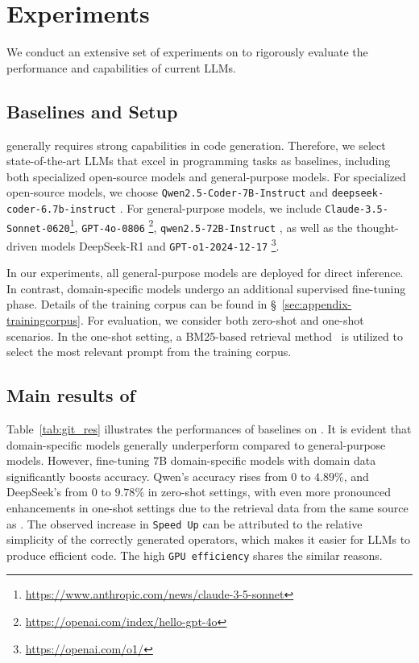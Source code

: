 \section{Experiments}
We conduct an extensive set of experiments on \benchall to rigorously evaluate the performance and capabilities of current LLMs.


\subsection{Baselines and Setup}
\label{sec:baselines}
\benchall generally requires strong capabilities in code generation. Therefore, we select state-of-the-art LLMs that excel in programming tasks as baselines, including both specialized open-source models and general-purpose models.
For specialized open-source models, we choose \texttt{Qwen2.5-Coder-7B-Instruct} \cite{hui2024qwen2} and \texttt{deepseek-coder-6.7b-instruct} \cite{guo2024deepseek}.
For general-purpose models, we include \texttt{Claude-3.5-Sonnet-0620}\footnote{\href{https://www.anthropic.com/news/claude-3-5-sonnet}{https://www.anthropic.com/news/claude-3-5-sonnet}}, \texttt{GPT-4o-0806} \footnote{\href{https://openai.com/index/hello-gpt-4o}{https://openai.com/index/hello-gpt-4o}}, \texttt{qwen2.5-72B-Instruct} \cite{yang2024qwen2}, as well as the thought-driven models DeepSeek-R1 \cite{guo2025deepseek} and \texttt{GPT-o1-2024-12-17} \footnote{\href{https://openai.com/o1/}{https://openai.com/o1/}}.


In our experiments, all general-purpose models are deployed for direct inference. 
In contrast, domain-specific models undergo an additional supervised fine-tuning phase. 
Details of the training corpus can be found in \S~\ref{sec:appendix-trainingcorpus}.
For evaluation, we consider both zero-shot and one-shot scenarios. 
In the one-shot setting, a BM25-based retrieval method~\cite{bm25robertson2009} is utilized to select the most relevant prompt from the training corpus. 


\subsection{Main results of \benchone}
\label{sec:main_res}
Table~\ref{tab:git_res} illustrates the performances of baselines on \benchone. 
It is evident that domain-specific models generally underperform compared to general-purpose models. 
However, fine-tuning $7$B domain-specific models with domain data significantly boosts accuracy. 
Qwen's accuracy rises from $0$ to $4.89$\%, and DeepSeek's from $0$ to $9.78$\% in zero-shot settings, with even more pronounced enhancements in one-shot settings due to the retrieval data from the same source as \benchone. 
The observed increase in \texttt{Speed Up} can be attributed to the relative simplicity of the correctly generated operators, which makes it easier for LLMs to produce efficient code.
The high \texttt{GPU efficiency} shares the similar reasons. 

